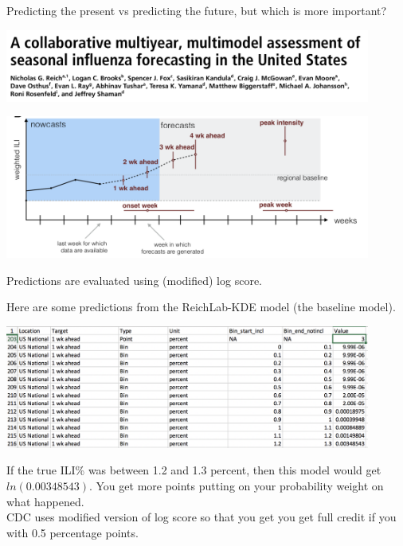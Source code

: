 \documentclass[aspectratio=169]{beamer}
\begin{document}
\begin{frame}

Predicting the present vs predicting the future, but which is more important?

\end{frame}
\begin{frame}

\begin{center}
\includegraphics[width = 0.9\textwidth]{figures/reich_collaborative_2019_title}
\end{center}

\end{frame}
\begin{frame}

\begin{center}
\includegraphics[width = 0.9\textwidth]{figures/reich_collaborative_2019_fig2b}
\end{center}

\end{frame}
\begin{frame}

Predictions are evaluated using (modified) log score.

Here are some predictions from the ReichLab-KDE model (the baseline model).

\begin{center}
\includegraphics[width = 0.9\textwidth]{figures/reich_collaborative_2019_example_predictions}
\end{center}

If the true ILI\% was between 1.2 and 1.3 percent, then this model would get $ln(0.00348543)$.  You get more points putting on your probability weight on what happened.\\

\pause
CDC uses modified version of log score so that you get you get full credit if you with 0.5 percentage points.

\end{frame}
\end{document}
